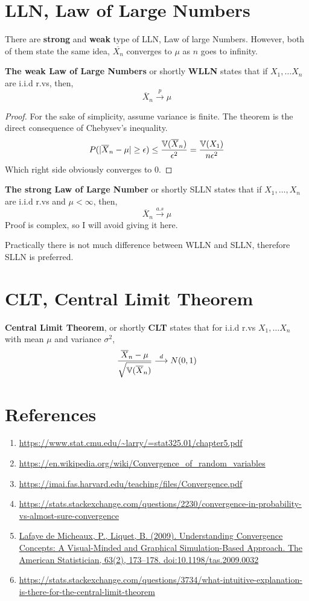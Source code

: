 \section{LLN, Law of Large Numbers}
There are \textbf{strong} and \textbf{weak} type of LLN, Law of large Numbers. However, both of them state the same idea, $\overline{X_n}$ converges to $\mu$ as  $n$ goes to infinity.
\begin{theorem}
    \textbf{The weak Law of Large Numbers} or shortly \textbf{WLLN} states that if $X_1, \ldots X_n$ are i.i.d r.vs, then,
    \[ \overline{X}_n \stackrel{p}{\longrightarrow} \mu\]
    \begin{proof}
        For the sake of simplicity, assume variance is finite.
        The theorem is the direct consequence of  Chebysev's inequality.
        \[ P( |\overline{X}_n - \mu| \ge \epsilon) \le \frac{{\mathbb{V}}(\overline{X}_n)}{\epsilon^2} = \frac{{\mathbb{V}}(X_1)}{n\epsilon^2}\]
    Which right side obviously converges to $0$.
    \end{proof}
\end{theorem}
\begin{theorem}
    \textbf{The strong Law of Large Number} or shortly SLLN states that if $X_1, \ldots,X_n$ are i.i.d r.vs and $\mu < \infty$, then,
    \[ \overline{X}_n \stackrel{a.s}{\longrightarrow} \mu \]
    Proof is complex, so I will avoid giving it here.
\end{theorem}
Practically there is not much difference between WLLN and SLLN, therefore SLLN is preferred.
\section{CLT, Central Limit Theorem}
\begin{theorem}
    \textbf{Central Limit Theorem}, or shortly \textbf{CLT} states that for i.i.d r.vs $X_1, \ldots X_n$ with mean $\mu$ and variance $\sigma^2$,
    \[ \frac{\overline{X}_n - \mu}{\sqrt{{\mathbb{V}} ( \overline{X}_n)}} \stackrel{d}{\longrightarrow} N(0,1)\]
\end{theorem}

\section{References}
\begin{enumerate}
    \item \url{https://www.stat.cmu.edu/~larry/=stat325.01/chapter5.pdf} 
    \item \url{https://en.wikipedia.org/wiki/Convergence_of_random_variables}
    \item \url{https://imai.fas.harvard.edu/teaching/files/Convergence.pdf}
    \item \url{https://stats.stackexchange.com/questions/2230/convergence-in-probability-vs-almost-sure-convergence}
    \item \url{Lafaye de Micheaux, P.,  Liquet, B. (2009). Understanding Convergence Concepts: A Visual-Minded and Graphical Simulation-Based Approach. The American Statistician, 63(2), 173–178. doi:10.1198/tas.2009.0032}
    \item \url{https://stats.stackexchange.com/questions/3734/what-intuitive-explanation-is-there-for-the-central-limit-theorem}
\end{enumerate}
